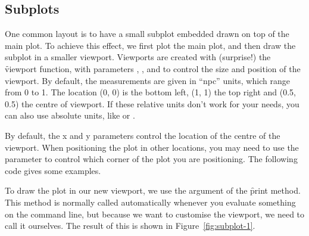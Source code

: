 % 


\subsection{Subplots}

One common layout is to have a small subplot embedded drawn on top of the main plot.  To achieve this effect, we first plot the main plot, and then draw the subplot in a smaller viewport.  Viewports are created with (surprise!) the \f{viewport} function, with parameters , ,  and  to control the size and position of the viewport. By default, the measurements are given in ``npc'' units, which range from 0 to 1. The location (0, 0) is the bottom left, (1, 1) the top right and (0.5, 0.5) the centre of viewport.  If these relative units don't work for your needs, you can also use absolute units, like  or .

% 
% 
% 


By default, the x and y parameters control the location of the centre of the viewport. When positioning the plot in other locations, you may need to use the  parameter to control which corner of the plot you are positioning.  The following code gives some examples.

% 


To draw the plot in our new viewport, we use the  argument of the  \f{print} method.  This method is normally called automatically whenever you evaluate something on the command line, but because we want to customise the viewport, we need to call it ourselves.  The result of this is shown in Figure~\ref{fig:subplot-1}.

